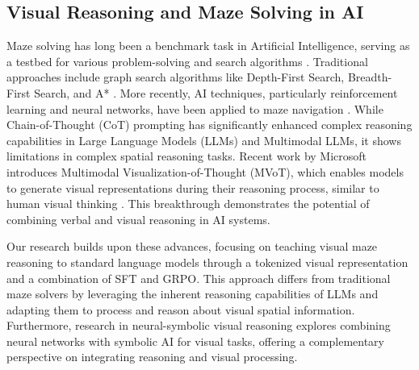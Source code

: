 \subsection{Visual Reasoning and Maze Solving in AI}

Maze solving has long been a benchmark task in Artificial Intelligence, serving as a testbed for various problem-solving and search algorithms \citep{MazeSolverRobotScholarWorks}. Traditional approaches include graph search algorithms like Depth-First Search, Breadth-First Search, and A* \citep{PathfindingAlgorithmsRedBlobGames}. More recently, AI techniques, particularly reinforcement learning and neural networks, have been applied to maze navigation \citep{DeepRLMazeSolvingSamyzaf}.
While Chain-of-Thought (CoT) prompting has significantly enhanced complex reasoning capabilities in Large Language Models (LLMs) and Multimodal LLMs, it shows limitations in complex spatial reasoning tasks. Recent work by Microsoft introduces Multimodal Visualization-of-Thought (MVoT), which enables models to generate visual representations during their reasoning process, similar to human visual thinking \citep{li2025imaginereasoningspacemultimodal}. This breakthrough demonstrates the potential of combining verbal and visual reasoning in AI systems.


Our research builds upon these advances, focusing on teaching visual maze reasoning to standard language models through a tokenized visual representation and a combination of SFT and GRPO. This approach differs from traditional maze solvers by leveraging the inherent reasoning capabilities of LLMs and adapting them to process and reason about visual spatial information. Furthermore, research in neural-symbolic visual reasoning \citep{NeuralSymbolicVisualReasoningArxiv} explores combining neural networks with symbolic AI for visual tasks, offering a complementary perspective on integrating reasoning and visual processing.